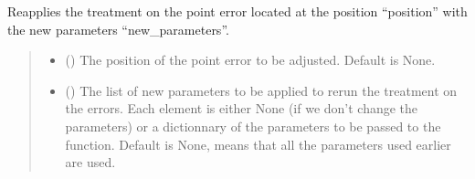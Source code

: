 \documentclass[letterpaper,10pt,english]{sphinxmanual}
\begin{document}
\begin{fulllineitems}
\begin{fulllineitems}
\begin{quote}
\begin{description}
\begin{itemize}
\end{itemize}

\end{description}\end{quote}

\end{fulllineitems}


\begin{fulllineitems}
\label{\detokenize{source/_autosummary/HDF5_BLS_treat.Treat:HDF5_BLS_treat.Treat.adjust_treatment_on_errors}}
\pysigstartsignatures
\pysiglinewithargsret
{}
{\sphinxparamcomma {}}
{}
\pysigstopsignatures
\sphinxAtStartPar
Reapplies the treatment on the point error located at the position “position” with the new parameters “new\_parameters”.
\begin{quote}\begin{description}
\begin{itemize}
\item {} 
\sphinxAtStartPar
{} (\sphinxstyleliteralemphasis{\sphinxupquote{, }}) \textendash{} The position of the point error to be adjusted. Default is None.

\item {} 
\sphinxAtStartPar
{} (\sphinxstyleliteralemphasis{\sphinxupquote{, }}) \textendash{} The list of new parameters to be applied to re\sphinxhyphen{}run the treatment on the errors. Each element is either None (if we don’t change the parameters) or a dictionnary of the parameters to be passed to the function. Default is None, means that all the parameters used earlier are used.

\end{itemize}

\end{description}\end{quote}


\end{fulllineitems}
\end{fulllineitems}
\end{document}
